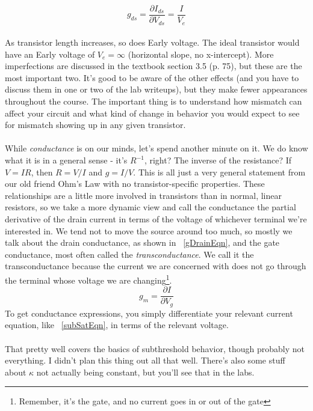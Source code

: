 \begin{equation}
g_{ds} = \frac{\partial I_{ds}}{\partial V_{ds}} = \frac{I}{V_e}
\label{gDrainEqn}
\end{equation}
\\
As transistor length increases, so does Early voltage. The ideal transistor would have an Early voltage of $V_e = \infty$ (horizontal slope, no x-intercept). More imperfections are discussed in the textbook section 3.5 (p. 75), but these are the most important two. It's good to be aware of the other effects (and you have to discuss them in one or two of the lab writeups), but they make fewer appearances throughout the course. The important thing is to understand how mismatch can affect your circuit and what kind of change in behavior you would expect to see for mismatch showing up in any given transistor.\\ \\
While \emph{conductance} is on our minds, let's spend another minute on it. We do know what it is in a general sense - it's $R^{-1}$, right? The inverse of the resistance? If $V = IR$, then $R = V/I$ and $g = I/V$. This is all just a very general statement from our old friend Ohm's Law with no transistor-specific properties. These relationships are a little more involved in transistors than in normal, linear resistors, so we take a more dynamic view and call the conductance the partial derivative of the drain current in terms of the voltage of whichever terminal we're interested in. We tend not to move the source around too much, so mostly we talk about the drain conductance, as shown in ~\eqref{gDrainEqn}, and the gate conductance, most often called the \emph{transconductance}. We call it the transconductance because the current we are concerned with does not go through the terminal whose voltage we are changing\footnote{Remember, it's the gate, and no current goes in or out of the gate}.
\begin{equation}
g_{m} = \frac{\partial I}{\partial V_{g}}
\label{gTransEqn}
\end{equation}
To get conductance expressions, you simply differentiate your relevant current equation, like ~\eqref{subSatEqn}, in terms of the relevant voltage.\\ \\
That pretty well covers the basics of subthreshold behavior, though probably not everything. I didn't plan this thing out all that well. There's also some stuff about $\kappa$ not actually being constant, but you'll see that in the labs.
